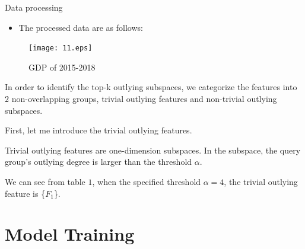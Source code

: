 \documentclass[
 size=14pt,
 paper=smartboard,  %
 mode=present, 		%
 display=slides, 	%
 style=tuliplab,  	%
 pauseslide,
 fleqn,leqno]{powerdot}
\begin{document}
\begin{slide}[toc=,bm=]{Data processing}
\begin{itemize}
\item The processed data are as follows:

\end{itemize}
\begin{figure}     
\centering     
\texttt{[image: 11.eps]}     
\caption{GDP of 2015-2018}     
\label{fig:test} 
\end{figure}

\begin{note}
In order to identify the top-k outlying subspaces,
we categorize the features into $2$ non-overlapping groups,
trivial outlying features and non-trivial outlying subspaces.

First, let me introduce the trivial outlying features.

Trivial outlying features are one-dimension subspaces.
In the subspace,
the query group's outlying degree is larger than the threshold $\alpha$.

We can see from table $1$,
when the specified threshold $\alpha = 4$,
the trivial outlying feature is \{$F_1$\}.
\end{note}

\end{slide}
\section{Model Training}

\end{document}
